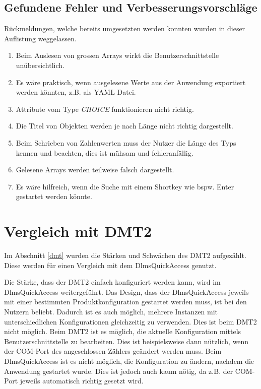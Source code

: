 \subsection{Gefundene Fehler und Verbesserungsvorschläge}
Rückmeldungen, welche bereits umgesetzten werden konnten wurden in dieser Auflistung weggelassen.
\begin{enumerate}
   \item Beim Auslesen von grossen Arrays wirkt die Benutzerschnittstelle unübersichtlich.
   \item Es wäre praktisch, wenn ausgelesene Werte aus der Anwendung exportiert werden könnten, z.B. als \ac{YAML} Datei.
   \item Attribute vom Type \textit{CHOICE} funktionieren nicht richtig.
   \item Die Titel von Objekten werden je nach Länge nicht richtig dargestellt.
   \item Beim Schrieben von Zahlenwerten muss der Nutzer die Länge des Typs kennen und beachten, dies ist mühsam und fehleranfällig.
   \item Gelesene Arrays werden teilweise falsch dargestellt.
   \item Es wäre hilfreich, wenn die Suche mit einem Shortkey wie bspw. Enter gestartet werden könnte.
\end{enumerate}

\section{Vergleich mit DMT2}
Im Abschnitt \ref{dmt} wurden die Stärken und Schwächen des \ac{DMT2} aufgezählt.
Diese werden für einen Vergleich mit dem DlmsQuickAccess genutzt.

Die Stärke, dass der \ac{DMT2} einfach konfiguriert werden kann, wird im DlmsQuickAccess weitergeführt.
Das Design, dass der DlmsQuickAccess jeweils mit einer bestimmten Produktkonfiguration gestartet werden muss, ist bei den Nutzern beliebt.
Dadurch ist es auch möglich, mehrere Instanzen mit unterschiedlichen Konfigurationen gleichzeitig zu verwenden.
Dies ist beim \ac{DMT2} nicht möglich.
Beim \ac{DMT2} ist es möglich, die aktuelle Konfiguration mittels Benutzerschnittstelle zu bearbeiten.
Dies ist beispielsweise dann nützlich, wenn der COM-Port des angeschlossen Zählers geändert werden muss.
Beim DlmsQuickAccess ist es nicht möglich, die Konfiguration zu ändern, nachdem die Anwendung gestartet wurde.
Dies ist jedoch auch kaum nötig, da z.B. der COM-Port jeweils automatisch richtig gesetzt wird.

